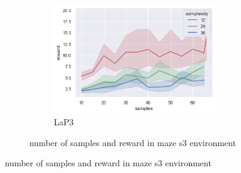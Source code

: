 \documentclass[bibliography=totoc]{scrartcl}
\begin{document}
\begin{figure}[H]
\begin{figure}[H]
\begin{subfigure}[b]{0.3\linewidth}
		\includegraphics[width=\linewidth]{img/maze_sample_reward_lap3.png}
        \caption{LaP3}
	\end{subfigure}
	\caption{number of samples and reward in maze s3 environment}
	\label{fig:SampleRewardMazeDifferentSpaceComplexityAlgo}
\end{figure}

\end{figure}
\end{document}

